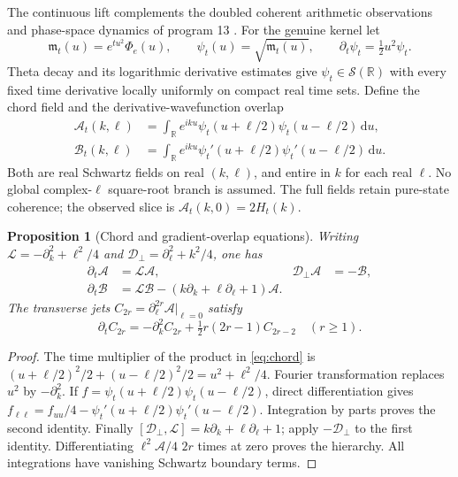 \documentclass[11pt]{article}
\newtheorem{proposition}[theorem]{Proposition}
\theoremstyle{definition}
\theoremstyle{remark}
\newcommand{\dd}{\,\mathrm d}
\newcommand{\Sch}{\mathcal S}
\begin{document}
The continuous lift complements the doubled coherent arithmetic observations
and phase-space dynamics of program 13 \cite{microlocalnotes}.
For the genuine kernel let
\begin{equation}
 \mathfrak m_t(u)=e^{tu^2}\Phi_e(u),\qquad \psi_t(u)=\sqrt{\mathfrak m_t(u)},\qquad
 \partial_t\psi_t=\tfrac12u^2\psi_t.
 \label{eq:wave}
\end{equation}
Theta decay and its logarithmic derivative estimates give
$\psi_t\in\Sch(\mathbb R)$ with every fixed time derivative locally
uniformly on compact real time sets. Define the chord field and the
derivative-wavefunction overlap
\begin{align}
 \mathcal A_t(k,\ell)&=\int_{\mathbb R}e^{iku}
       \psi_t(u+\ell/2)\psi_t(u-\ell/2)\dd u,\label{eq:chord}\\
 \mathcal B_t(k,\ell)&=\int_{\mathbb R}e^{iku}
       \psi_t'(u+\ell/2)\psi_t'(u-\ell/2)\dd u.\nonumber
\end{align}
Both are real Schwartz fields on real $(k,\ell)$, and entire in $k$ for
each real $\ell$. No global complex-$\ell$ square-root branch is assumed.
The full fields retain pure-state coherence; the observed slice is
$\mathcal A_t(k,0)=2H_t(k)$.

\begin{proposition}[Chord and gradient-overlap equations]
\label{prop:chord}
Writing $\mathcal L=-\partial_k^2+\ell^2/4$ and
$\mathcal D_\perp=\partial_\ell^2+k^2/4$, one has
\begin{align}
 \partial_t\mathcal A&=\mathcal L\mathcal A,
 &\mathcal D_\perp\mathcal A&=-\mathcal B,\label{eq:chord-system}\\
 \partial_t\mathcal B&=\mathcal L\mathcal B
       -(k\partial_k+\ell\partial_\ell+1)\mathcal A.\nonumber
\end{align}
The transverse jets $C_{2r}=\partial_\ell^{2r}\mathcal A|_{\ell=0}$
satisfy
\begin{equation}
 \partial_tC_{2r}=-\partial_k^2C_{2r}
                         +\tfrac12r(2r-1)C_{2r-2}\quad(r\ge1).
 \label{eq:jet-hierarchy}
\end{equation}
\end{proposition}
\begin{proof}
The time multiplier of the product in \eqref{eq:chord} is
$(u+\ell/2)^2/2+(u-\ell/2)^2/2=u^2+\ell^2/4$.
Fourier transformation replaces $u^2$ by $-\partial_k^2$.
If $f=\psi_t(u+\ell/2)\psi_t(u-\ell/2)$, direct differentiation gives
$f_{\ell\ell}=f_{uu}/4-\psi_t'(u+\ell/2)\psi_t'(u-\ell/2)$.
Integration by parts proves the second identity. Finally
$[\mathcal D_\perp,\mathcal L]=k\partial_k+\ell\partial_\ell+1$;
apply $-\mathcal D_\perp$ to the first identity. Differentiating
$\ell^2\mathcal A/4$ $2r$ times at zero proves the hierarchy.
All integrations have vanishing Schwartz boundary terms.
\end{proof}
\end{document}
